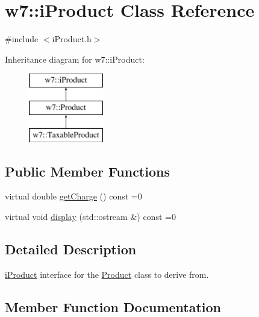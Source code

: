 \hypertarget{classw7_1_1iProduct}{}\section{w7\+:\+:i\+Product Class Reference}
\label{classw7_1_1iProduct}


{\ttfamily \#include $<$i\+Product.\+h$>$}

Inheritance diagram for w7\+:\+:i\+Product\+:\begin{figure}[H]
\begin{center}
\leavevmode
\includegraphics[height=3.000000cm]{classw7_1_1iProduct}
\end{center}
\end{figure}
\subsection*{Public Member Functions}
\begin{DoxyCompactItemize}
\item 
virtual double \mbox{\hyperlink{classw7_1_1iProduct_a4e9fde11cffac0e4309c89d252db89bb}{get\+Charge}} () const =0
\item 
virtual void \mbox{\hyperlink{classw7_1_1iProduct_ad5aa580821cd5cac0acd07841019ed82}{display}} (std\+::ostream \&) const =0
\end{DoxyCompactItemize}


\subsection{Detailed Description}
\mbox{\hyperlink{classw7_1_1iProduct}{i\+Product}} interface for the \mbox{\hyperlink{classw7_1_1Product}{Product}} class to derive from. 

\subsection{Member Function Documentation}
\mbox{\label{classw7_1_1iProduct_ad5aa580821cd5cac0acd07841019ed82}} 

